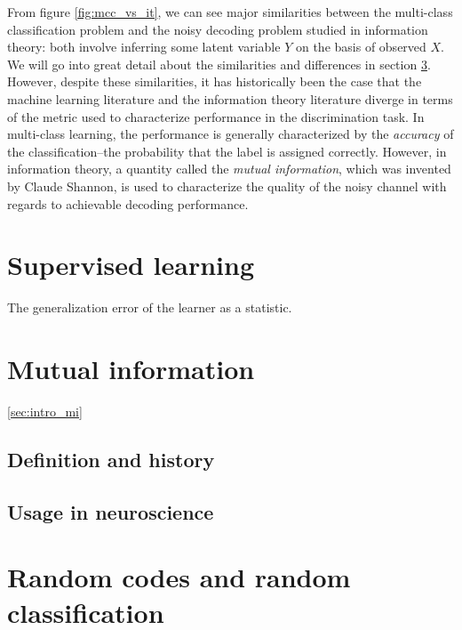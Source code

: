 From figure \ref{fig:mcc_vs_it}, we can see major similarities between
the multi-class classification problem and the noisy decoding problem
studied in information theory: both involve inferring some latent
variable $Y$ on the basis of observed $X$.  We will go into great
detail about the similarities and differences in section
\ref{sec:rand_code_rand_class}.  However, despite these similarities,
it has historically been the case that the machine learning literature
and the information theory literature diverge in terms of the metric
used to characterize performance in the discrimination task.  In
multi-class learning, the performance is generally characterized by
the \emph{accuracy} of the classification--the probability that the
label is assigned correctly.  However, in information theory, a
quantity called the \emph{mutual information}, which was invented by
Claude Shannon, is used to characterize the quality of the noisy
channel with regards to achievable decoding performance. %

\section{Supervised learning}

The generalization error of the learner as a statistic.


\section{Mutual information}\ref{sec:intro_mi}

\subsection{Definition and history}

\subsection{Usage in neuroscience}


\section{Random codes and random classification}\label{sec:rand_code_rand_class}


